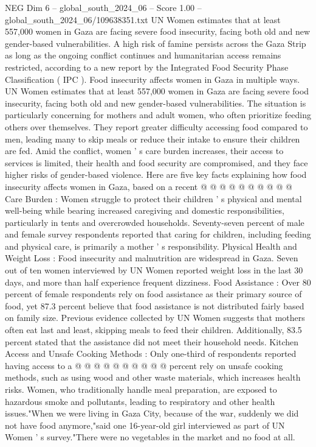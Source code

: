 \begin{textsample}{NEG Dim 6 – global\_south\_2024\_06 – Score 1.00 – global\_south\_2024\_06/109638351.txt}  \label{ex:f6_neg_305}
UN Women estimates that at least 557,000 women in Gaza are facing severe food insecurity, facing both old and new gender-based vulnerabilities.
A high risk of famine persists across the Gaza Strip as long as the ongoing conflict continues and humanitarian access remains restricted, according to a new report by the Integrated Food Security Phase Classification ( IPC ).
Food insecurity affects women in Gaza in multiple ways.
UN Women estimates that at least 557,000 women in Gaza are facing severe food insecurity, facing both old and new gender-based vulnerabilities.
The situation is particularly concerning for mothers and adult women, who often prioritize feeding others over themselves.
They report greater difficulty accessing food compared to men, leading many to skip meals or reduce their intake to ensure their children are fed.
Amid the conflict, women ' s care burden increases, their access to services is limited, their health and food security are compromised, and they face higher risks of gender-based violence.
Here are five key facts explaining how food insecurity affects women in Gaza, based on a recent @ @ @ @ @ @ @ @ @ @ Care Burden : Women struggle to protect their children ' s physical and mental well-being while bearing increased caregiving and domestic responsibilities, particularly in tents and overcrowded households.
Seventy-seven percent of male and female survey respondents reported that caring for children, including feeding and physical care, is primarily a mother ' s responsibility.
Physical Health and Weight Loss : Food insecurity and malnutrition are widespread in Gaza.
Seven out of ten women interviewed by UN Women reported weight loss in the last 30 days, and more than half experience frequent dizziness.
Food Assistance : Over 80 percent of female respondents rely on food assistance as their primary source of food, yet 87.3 percent believe that food assistance is not distributed fairly based on family size.
Previous evidence collected by UN Women suggests that mothers often eat last and least, skipping meals to feed their children.
Additionally, 83.5 percent stated that the assistance did not meet their household needs.
Kitchen Access and Unsafe Cooking Methods : Only one-third of respondents reported having access to a @ @ @ @ @ @ @ @ @ @ percent rely on unsafe cooking methods, such as using wood and other waste materials, which increases health risks.
Women, who traditionally handle meal preparation, are exposed to hazardous smoke and pollutants, leading to respiratory and other health issues."When we were living in Gaza City, because of the war, suddenly we did not have food anymore,"said one 16-year-old girl interviewed as part of UN Women ' s survey."There were no vegetables in the market and no food at all.

\end{textsample}
